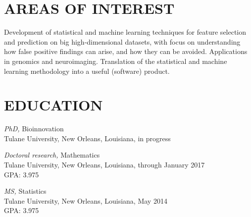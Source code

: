 \documentclass[margin]{res} %
\begin{document}
\begin{resume}
%
%
%
%

\section{AREAS OF INTEREST}

Development of statistical and machine learning techniques for feature selection and prediction on big high-dimensional datasets, with focus on understanding how false positive findings can arise, and how they can be avoided.
Applications in genomics and neuroimaging.
Translation of the statistical and machine learning methodology into a useful (software) product.


\section{EDUCATION}

{\sl PhD,} Bioinnovation \\
Tulane University, New Orleans, Louisiana, in progress

{\sl Doctoral research,} Mathematics \\
Tulane University, New Orleans, Louisiana, through January 2017\\
GPA: 3.975

{\sl MS,} Statistics \\
Tulane University, New Orleans, Louisiana, May 2014\\
GPA: 3.975


\end{resume}
\end{document}
